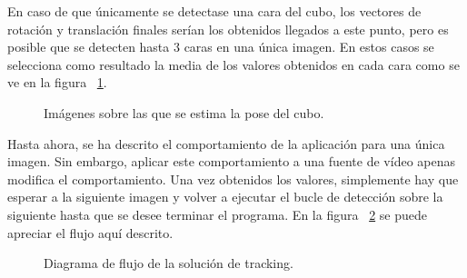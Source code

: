 En caso de que únicamente se detectase una cara del cubo, los vectores de rotación y translación finales serían los obtenidos llegados a este punto, pero es posible que se detecten hasta 3 caras en una única imagen. En estos casos se selecciona como resultado la media de los valores obtenidos en cada cara como se ve en la figura \figurename~\ref{fig:cubo_detected}.

\begin{figure}%
    \centering
    \qquad
    \caption{Imágenes sobre las que se estima la pose del cubo.}%
    \label{fig:cubo_detected}%
\end{figure}

Hasta ahora, se ha descrito el comportamiento de la aplicación para una única imagen. Sin embargo, aplicar este comportamiento a una fuente de vídeo apenas modifica el comportamiento. Una vez obtenidos los valores, simplemente hay que esperar a la siguiente imagen y volver a ejecutar el bucle de detección sobre la siguiente hasta que se desee terminar el programa. En la figura \figurename~\ref{fig:flujo_tfg} se puede apreciar el flujo aquí descrito.

\begin{figure}
  \centering
  
  \caption{Diagrama de flujo de la solución de tracking.}
  \label{fig:flujo_tfg}
\end{figure}




